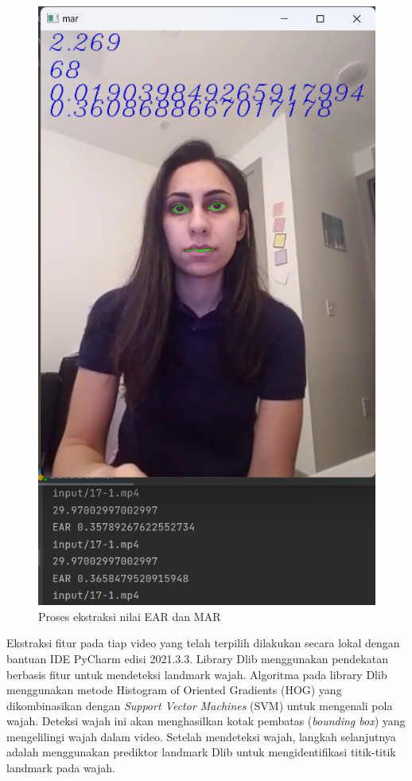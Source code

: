 \begin{figure} [H] \centering
      \includegraphics[scale=0.65]{gambar/ekstraksi.png}
      \caption{Proses ekstraksi nilai EAR dan MAR}
      \label{fig:ekstraksi}
\end{figure}

Ekstraksi fitur pada tiap video yang telah terpilih dilakukan secara lokal dengan bantuan IDE PyCharm edisi 2021.3.3.
Library Dlib menggunakan pendekatan berbasis fitur untuk mendeteksi landmark wajah. Algoritma pada library Dlib menggunakan
metode Histogram of Oriented Gradients (HOG) yang dikombinasikan dengan \emph{Support Vector Machines} (SVM) untuk mengenali pola wajah.
Deteksi wajah ini akan menghasilkan kotak pembatas (\emph{bounding box}) yang mengelilingi wajah dalam video. Setelah mendeteksi wajah,
langkah selanjutnya adalah menggunakan prediktor landmark Dlib untuk mengidentifikasi titik-titik landmark pada wajah.

